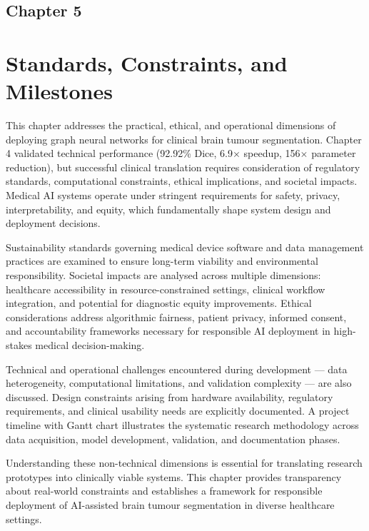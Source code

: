 \begin{center}
    \section*{\fontsize{20}{20}\selectfont Chapter 5}
\end{center}
\vspace{10mm}

\section{Standards, Constraints, and Milestones}

This chapter addresses the practical, ethical, and operational dimensions of deploying graph neural networks for clinical brain tumour segmentation. Chapter 4 validated technical performance (92.92\% Dice, 6.9$\times$ speedup, 156$\times$ parameter reduction), but successful clinical translation requires consideration of regulatory standards, computational constraints, ethical implications, and societal impacts. Medical AI systems operate under stringent requirements for safety, privacy, interpretability, and equity, which fundamentally shape system design and deployment decisions.

Sustainability standards governing medical device software and data management practices are examined to ensure long-term viability and environmental responsibility. Societal impacts are analysed across multiple dimensions: healthcare accessibility in resource-constrained settings, clinical workflow integration, and potential for diagnostic equity improvements. Ethical considerations address algorithmic fairness, patient privacy, informed consent, and accountability frameworks necessary for responsible AI deployment in high-stakes medical decision-making.

Technical and operational challenges encountered during development — data heterogeneity, computational limitations, and validation complexity — are also discussed. Design constraints arising from hardware availability, regulatory requirements, and clinical usability needs are explicitly documented. A project timeline with Gantt chart illustrates the systematic research methodology across data acquisition, model development, validation, and documentation phases.

Understanding these non-technical dimensions is essential for translating research prototypes into clinically viable systems. This chapter provides transparency about real-world constraints and establishes a framework for responsible deployment of AI-assisted brain tumour segmentation in diverse healthcare settings.


